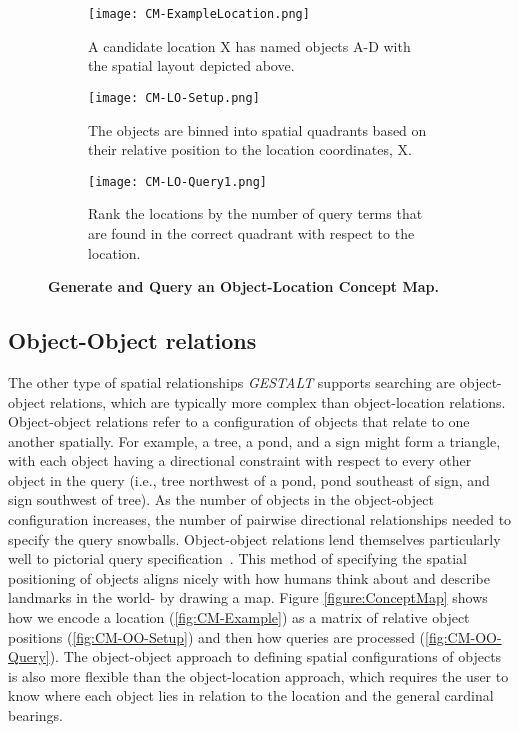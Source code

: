 \begin{figure*}[h]
    \centering
    \begin{subfigure}[t]{.25\textwidth}
        \texttt{[image: CM-ExampleLocation.png]}
        \caption{\small A candidate location X has named objects A-D with the spatial layout depicted above.} 
        \label{fig:CM-LO-Example}
    \end{subfigure}
    \hfill
    \begin{subfigure}[t]{.25\textwidth}
        \texttt{[image: CM-LO-Setup.png]}
        \caption{\small The objects are binned into spatial quadrants based on their relative position to the location coordinates, X.} 
        \label{fig:CM-LO-Setup}
    \end{subfigure}
    \hfill
        \begin{subfigure}[t]{.25\textwidth}
        \texttt{[image: CM-LO-Query1.png]}
        \caption{\small Rank the locations by the number of query terms that are found in the correct quadrant with respect to the location.}
        \label{fig:CM-LO-Query}
    \hfill
    \end{subfigure}
    \caption{\textbf{Generate and Query an Object-Location Concept Map.}}\label{figure:ConceptMap-LO} 
\end{figure*}



\subsection{Object-Object relations}

The other type of spatial relationships \emph{GESTALT} supports searching are object-object relations, which are typically more complex than object-location relations.
Object-object relations refer to a configuration of objects that relate to one another spatially.
For example, a tree, a pond, and a sign might form a triangle, with each object having a directional constraint with respect to every other object in the query (i.e., tree northwest of a pond, pond southeast of sign, and sign southwest of tree).
As the number of objects in the object-object configuration increases, the number of pairwise directional relationships needed to specify the query snowballs.
Object-object relations lend themselves particularly well to pictorial query specification~\cite{Soffer1997}.
This method of specifying the spatial positioning of objects aligns nicely with how humans think about and describe landmarks in the world- by drawing a map. 
Figure \ref{figure:ConceptMap} shows how we encode a location (\ref{fig:CM-Example}) as a matrix of relative object positions (\ref{fig:CM-OO-Setup}) and then how queries are processed (\ref{fig:CM-OO-Query}).
The object-object approach to defining spatial configurations of objects is also more flexible than the object-location approach, which requires the user to know where each object lies in relation to the location and the general cardinal bearings.

